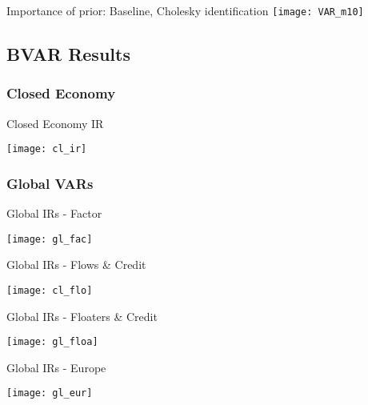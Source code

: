 \documentclass{beamer}
\begin{document}
\begin{frame}{Importance of prior: Baseline, Cholesky identification}
\texttt{[image: VAR\_m10]}
\end{frame}


\subsection{BVAR Results}
\subsubsection*{Closed Economy} %
\begin{frame}{Closed Economy IR}
\begin{center}
\texttt{[image: cl\_ir]}
\end{center}
\end{frame}
\subsubsection*{Global VARs}
\begin{frame}{Global IRs - Factor}
\begin{center}
\texttt{[image: gl\_fac]}
\end{center}
\end{frame}
\begin{frame}{Global IRs - Flows \& Credit}
\begin{center}
\texttt{[image: cl\_flo]}
\end{center}
\end{frame}
\begin{frame}{Global IRs - Floaters \& Credit}
\begin{center}
\texttt{[image: gl\_floa]}
\end{center}
\end{frame}
\begin{frame}{Global IRs - Europe}
\begin{center}
\texttt{[image: gl\_eur]}
\end{center}
\end{frame}
\end{document}

